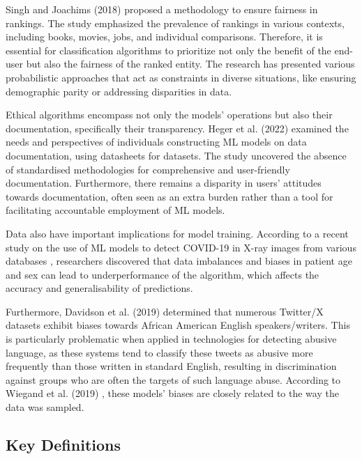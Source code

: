 \documentclass[twoside,11pt]{article}
\begin{document}
Singh and Joachims (2018)  proposed a methodology to ensure fairness in rankings. The study emphasized the prevalence of rankings in various contexts, including books, movies, jobs, and individual comparisons. Therefore, it is essential for classification algorithms to prioritize not only the benefit of the end-user but also the fairness of the ranked entity. The research has presented various probabilistic approaches that act as constraints in diverse situations, like ensuring demographic parity or addressing disparities in data.

Ethical algorithms encompass not only the models' operations but also their documentation, specifically their transparency. Heger et al. (2022)  examined the needs and perspectives of individuals constructing ML models on data documentation, using datasheets for datasets. The study uncovered the absence of standardised methodologies for comprehensive and user-friendly documentation. Furthermore, there remains a disparity in users' attitudes towards documentation, often seen as an extra burden rather than a tool for facilitating accountable employment of ML models.

Data also have important implications for model training. According to a recent study on the use of ML models to detect COVID-19 in X-ray images from various databases , researchers discovered that data imbalances and biases in patient age and sex can lead to underperformance of the algorithm, which affects the accuracy and generalisability of predictions.

Furthermore, Davidson et al. (2019)  determined that numerous Twitter/X datasets exhibit biases towards African American English speakers/writers. This is particularly problematic when applied in technologies for detecting abusive language, as these systems tend to classify these tweets as abusive more frequently than those written in standard English, resulting in discrimination against groups who are often the targets of such language abuse. According to Wiegand et al. (2019) , these models' biases are closely related to the way the data was sampled. 

\subsection{Key Definitions}
\end{document}
